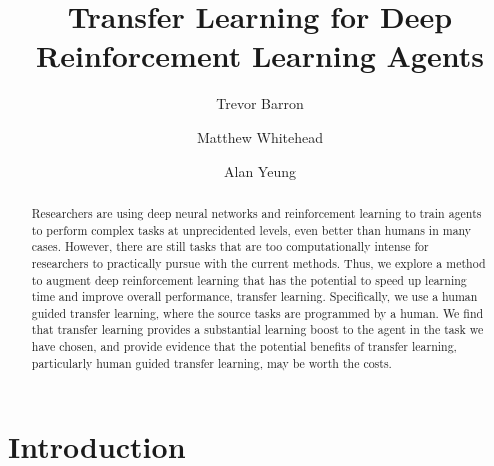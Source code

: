 \documentclass{llncs}
\begin{document}
%
%

%
%
\title{Transfer Learning for Deep Reinforcement Learning Agents}
%
%
\author{Trevor Barron \and Matthew Whitehead \and Alan Yeung}
%
%
%

\maketitle              %

\begin{abstract}
Researchers are using deep neural networks and reinforcement learning to train agents to perform complex tasks at unprecidented levels, even better than humans in many cases. 
However, there are still tasks that are too computationally intense for researchers to practically pursue with the current methods. 
Thus, we explore a method to augment deep reinforcement learning that has the potential to speed up learning time and improve overall performance, transfer learning. 
Specifically, we use a human guided transfer learning, where the source tasks are programmed by a human. 
We find that transfer learning provides a substantial learning boost to the agent in the task we have chosen, and provide evidence that the potential benefits of transfer learning, particularly human guided transfer learning, may be worth the costs. 
\end{abstract}
%

\section{Introduction}
\end{document}
